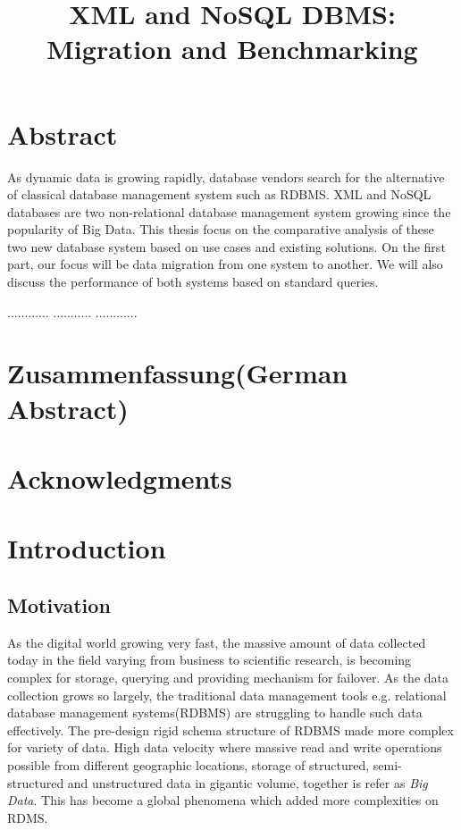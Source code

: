 \documentclass[a4paper,12pt]{article}
\title{XML and NoSQL DBMS: Migration and Benchmarking}
\subtitle{
}
\begin{document}
	\renewcommand{\lstlistingname}{Code}
	\maketitle
	\thispagestyle{empty}
	\newpage
	\section*{Abstract}
		As dynamic data is growing rapidly, database vendors search for the alternative of classical database management system such as RDBMS. XML and NoSQL databases are two non-relational database management system growing since the popularity of Big Data. This thesis focus on the comparative analysis of these two new database system based on use cases and existing solutions. On the first part, our focus will be data migration from one system to another. We will also discuss  the performance of both systems based on standard queries.
		
		............
		...........
		............
	
	\section*{Zusammenfassung(German Abstract)}
	
	\section*{Acknowledgments}
	
	\thispagestyle{empty}
	\newpage
	\tableofcontents
	\thispagestyle{empty}
	\newpage
	\section{Introduction}
	\setcounter{page}{1}
	\subsection{Motivation}
		\label{motivation}
			As the digital world growing very fast, the massive amount of data collected today in the field varying from business to scientific research, is becoming complex for storage, querying and providing mechanism for failover.  As the data collection grows so largely, the traditional data management tools e.g. relational database management systems(RDBMS) are struggling to handle such data effectively. The pre-design rigid schema structure of RDBMS made more complex for variety of data.  High data velocity where massive read and write operations possible from different geographic locations, storage of structured, semi-structured and unstructured data in gigantic volume, together is refer as  \textit{Big Data}. This has become a global phenomena which added more complexities on RDMS.
			
\end{document}
